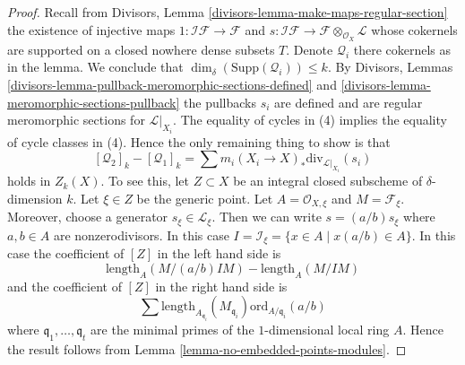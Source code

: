 \documentclass[10pt,a4paper]{amsart}
\theoremstyle{plain}
\theoremstyle{definition}
\theoremstyle{remark}
\numberwithin{equation}{subsection}
\begin{document}
\begin{proof}
Recall from Divisors, Lemma \ref{divisors-lemma-make-maps-regular-section}
the existence of injective maps
$1 : \mathcal{I}\mathcal{F} \to \mathcal{F}$ and
$s : \mathcal{I}\mathcal{F} \to \mathcal{F} \otimes_{\mathcal{O}_X}\mathcal{L}$
whose cokernels are supported on a closed nowhere dense subsets $T$.
Denote $\mathcal{Q}_i$ there cokernels as in the lemma.
We conclude that $\dim_\delta(\text{Supp}(\mathcal{Q}_i)) \leq k$.
By Divisors, Lemmas \ref{divisors-lemma-pullback-meromorphic-sections-defined}
and \ref{divisors-lemma-meromorphic-sections-pullback} the pullbacks $s_i$
are defined and are regular meromorphic sections for $\mathcal{L}|_{X_i}$.
The equality of cycles in (4) implies the equality of cycle classes
in (4). Hence the only remaining thing to show is that
$$
[\mathcal{Q}_2]_k - [\mathcal{Q}_1]_k
=
\sum m_i(X_i \to X)_*\text{div}_{\mathcal{L}|_{X_i}}(s_i)
$$
holds in $Z_k(X)$. To see this, let $Z \subset X$ be an integral closed
subscheme of $\delta$-dimension $k$. Let $\xi \in Z$ be the generic point.
Let $A = \mathcal{O}_{X, \xi}$ and $M = \mathcal{F}_\xi$.
Moreover, choose a generator $s_\xi \in \mathcal{L}_\xi$.
Then we can write $s = (a/b) s_\xi$ where $a, b \in A$ are
nonzerodivisors. In this case
$I = \mathcal{I}_\xi = \{x \in A \mid x(a/b) \in A\}$.
In this case the coefficient of $[Z]$ in the left hand side is
$$
\text{length}_A(M/(a/b)IM) - \text{length}_A(M/IM)
$$
and the coefficient of $[Z]$ in the right hand side
is
$$
\sum
\text{length}_{A_{\mathfrak q_i}}(M_{\mathfrak q_i})
\text{ord}_{A/\mathfrak q_i}(a/b)
$$
where $\mathfrak q_1, \ldots, \mathfrak q_t$ are the minimal
primes of the $1$-dimensional local ring $A$. Hence the result
follows from Lemma \ref{lemma-no-embedded-points-modules}.
\end{proof}
\end{document}
